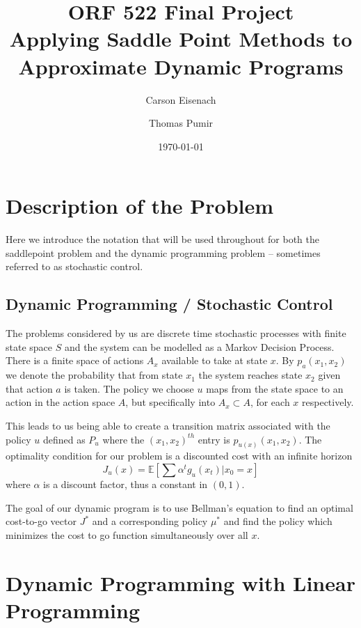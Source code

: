 \documentclass[12pt,reqno]{amsart}
\newcommand{\E}{\mathbb{E}}
\numberwithin{equation}{section}
\begin{document}
\title{ORF 522 Final Project \\ Applying Saddle Point Methods to Approximate Dynamic Programs}

\author{Carson Eisenach}
\author{Thomas Pumir}

\date{\today}

\maketitle

\section{Description of the Problem}

Here we introduce the notation that will be used throughout for both the saddlepoint problem and the dynamic programming problem -- sometimes referred to as stochastic control.

\subsection{Dynamic Programming / Stochastic Control}
The problems considered by us are discrete time stochastic processes with finite state space $S$ and the system can be modelled as a Markov Decision Process. There is a finite space of actions $A_x$ available to take at state $x$. By $p_a(x_1,x_2)$ we denote the probability that from state $x_1$ the system reaches state $x_2$ given that action $a$ is taken. The policy we choose $u$ maps from the state space to an action in the action space $A$, but specifically into $A_x \subset A$, for each $x$ respectively.

This leads to us being able to create a transition matrix associated with the policy $u$ defined as $P_u$ where the $(x_1,x_2)^{th}$ entry is $p_{u(x)}(x_1,x_2)$. The optimality condition for our problem is a discounted cost with an infinite horizon
$$
J_u(x) = \E [\sum \alpha^t g_u(x_t) | x_0 = x]
$$
where $\alpha$ is a discount factor, thus a constant in $(0,1)$.

The goal of our dynamic program is to use Bellman's equation to find an optimal cost-to-go vector $J^*$ and a corresponding policy $\mu^*$ and find the policy which minimizes the cost to go function simultaneously over all $x$.

\section{Dynamic Programming with Linear Programming}
\end{document}
